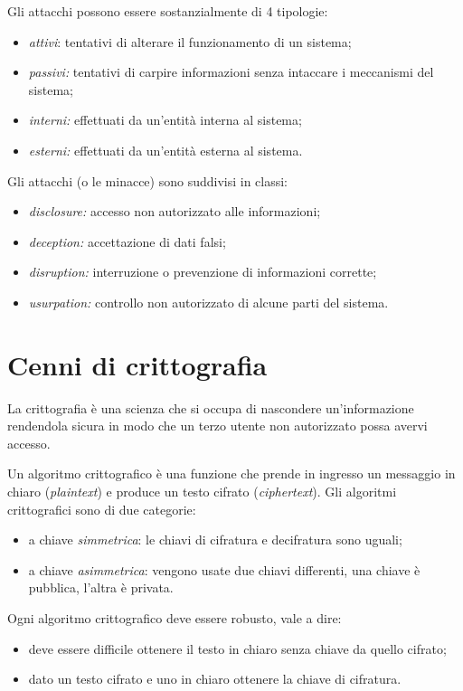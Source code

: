 \documentclass[a4paper, 11pt]{article}
\begin{document}
\begin{multicols}{2}
		Gli attacchi possono essere sostanzialmente di 4 tipologie:
		\begin{itemize}
			\item \textit{attivi}: tentativi di alterare il funzionamento di un sistema;
			\item \textit{passivi:} tentativi di carpire informazioni senza intaccare i meccanismi del sistema;
			\item \textit{interni:} effettuati da un'entità interna al sistema;
			\item \textit{esterni:} effettuati da un'entità esterna al sistema.
		\end{itemize}
		
		Gli attacchi (o le minacce) sono suddivisi in classi:
		\begin{itemize}
			\item \textit{disclosure:} accesso non autorizzato alle informazioni;
			\item \textit{deception:} accettazione di dati falsi;
			\item \textit{disruption:} interruzione o prevenzione di informazioni corrette;
			\item \textit{usurpation:} controllo non autorizzato di alcune parti del sistema.
		\end{itemize}
	
		\section{Cenni di crittografia}
		La crittografia è una scienza che si occupa di nascondere un'informazione rendendola sicura in modo che un terzo utente non autorizzato possa avervi accesso.
		
		Un algoritmo crittografico è una funzione che prende in ingresso un messaggio in chiaro (\textit{plaintext}) e produce un testo cifrato (\textit{ciphertext}). Gli algoritmi crittografici sono di due categorie:
		\begin{itemize}
			\item a chiave \textit{simmetrica}: le chiavi di cifratura e decifratura sono uguali;
			\item a chiave \textit{asimmetrica}: vengono usate due chiavi differenti, una chiave è pubblica, l'altra è privata.
		\end{itemize}
	
		Ogni algoritmo crittografico deve essere robusto, vale a dire:
		\begin{itemize}
			\item deve essere difficile ottenere il testo in chiaro senza chiave da quello cifrato;
			\item dato un testo cifrato e uno in chiaro ottenere la chiave di cifratura.
		\end{itemize}
	

\end{multicols}
\end{document}
